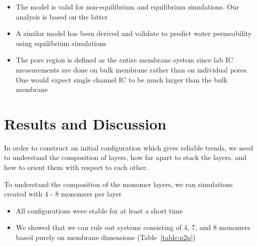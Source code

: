\documentclass{article}
\begin{document}
\begin{itemize}
\begin{itemize}
                        \item The model is valid for non-equilibrium and equilibrium simulations. Our analysis is based on the latter
                        \item A similar model has been derived and validate to predict water permeability using equilibrium simulations
                        \item The pore region is defined as the entire membrane system since lab IC measurements are done on bulk membrane rather than on individual pores. One would expect single channel IC to be much larger than the bulk membrane
                \end{itemize}
        \end{itemize}

	\section{Results and Discussion}

	In order to construct an initial configuration which gives reliable trends, we need to understand the composition of layers, how far apart to stack the layers, and how to orient them with respect to each other.
		
	To understand the composition of the monomer layers, we ran simulations created with 4 - 8 monomers per layer 
	\begin{itemize}
		\item All configurations were stable for at least a short time %
                \item We showed that we can rule out systems consisting of 4, 7, and 8 monomers based purely on membrane dimensions (Table~\ref{table:p2p})
        \end{itemize}
        
\end{document}
